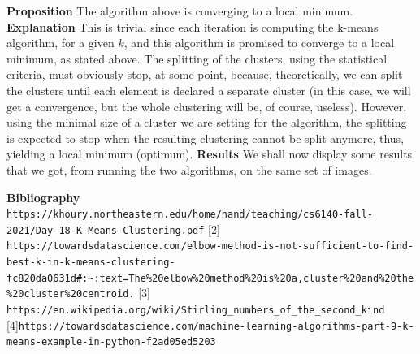 \documentclass[12pt]{article}
\begin{document}
\newpage
\textbf{Proposition} The algorithm above is converging to a local minimum.\newline
\textbf{Explanation} This is trivial since each iteration is computing the k-means algorithm, for a given $k$, and this algorithm is promised to converge to a local minimum, as stated above. \newline
The splitting of the clusters, using the statistical criteria, must obviously stop, at some point, because, theoretically, we can split the clusters until each element is declared a separate cluster (in this case, we will get a convergence, but the whole clustering will be, of course, useless). However, using the minimal size of a cluster we are setting for the algorithm, the splitting is expected to stop when the resulting clustering cannot be split anymore, thus, yielding a local minimum (optimum). \newline
\newpage
\textbf{Results}
We shall now display some results that we got, from running the two algorithms, on the same set of images. \newline

\newpage
\textbf{Bibliography} \newline
[1] \verb|https://khoury.northeastern.edu/home/hand/teaching/cs6140-fall-2021/Day-18-K-Means-Clustering.pdf|
[2] \verb|https://towardsdatascience.com/elbow-method-is-not-sufficient-to-find-best-k-in-k-means-clustering-fc820da0631d#:~:text=The%20elbow%20method%20is%20a,cluster%20and%20the%20cluster%20centroid.|
[3] \verb|https://en.wikipedia.org/wiki/Stirling_numbers_of_the_second_kind|
[4]\verb|https://towardsdatascience.com/machine-learning-algorithms-part-9-k-means-example-in-python-f2ad05ed5203|
\end{document}

